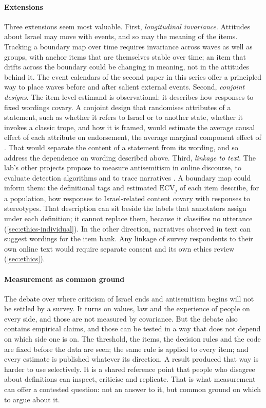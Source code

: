 \paragraph{Extensions}
Three extensions seem most valuable. First, \emph{longitudinal invariance}.
Attitudes about Israel may move with events, and so may the meaning of the
items. Tracking a boundary map over time requires invariance across waves as
well as groups, with anchor items that are themselves stable over time; an
item that drifts across the boundary could be changing in meaning, not in
the attitudes behind it. The event calendars of the second paper in this
series \citep{kornsteinlab2026p2contagion} offer a principled way to place
waves before and after salient external events. Second, \emph{conjoint
designs}. The item-level estimand is observational: it describes how
responses to fixed wordings covary. A conjoint design that randomises
attributes of a statement, such as whether it refers to Israel or to another
state, whether it invokes a classic trope, and how it is framed, would
estimate the average causal effect of each attribute on endorsement, the
average marginal component effect of \citet{hainmueller2014}. That would separate the content of a statement from
its wording, and so address the dependence on wording described above.
Third, \emph{linkage to text}. The lab's other projects propose to measure
antisemitism in online discourse, to evaluate detection algorithms and to
trace narratives \citep{kornsteinlab2026proposalmeasurement,kornsteinlab2026proposaldetection,kornsteinlab2026proposalnarratives}.
A boundary map could inform them: the definitional tags and estimated
$\mathrm{ECV}_j$ of each item describe, for a population, how responses to
Israel-related content covary with responses to stereotypes. That description
can sit beside the labels that annotators assign under each definition; it
cannot replace them, because it classifies no utterance
(\cref{sec:ethics-individual}). In the other direction, narratives observed in text can
suggest wordings for the item bank. Any linkage of survey respondents to
their own online text would require separate consent and its own ethics
review (\cref{sec:ethics}).

\paragraph{Measurement as common ground}
The debate over where criticism of Israel ends and antisemitism begins will
not be settled by a survey. It turns on values, law and the experience of
people on every side, and those are not measured by covariance. But the
debate also contains empirical claims, and those can be tested in a way that
does not depend on which side one is on. The threshold, the items, the
decision rules and the code are fixed before the data are seen; the same
rule is applied to every item; and every estimate is published whatever its
direction. A result produced that way is harder to use selectively. It is
a shared reference point that people who disagree about definitions can
inspect, criticise and replicate. That is what measurement can offer a
contested question: not an answer to it, but common ground on which to argue
about it.
